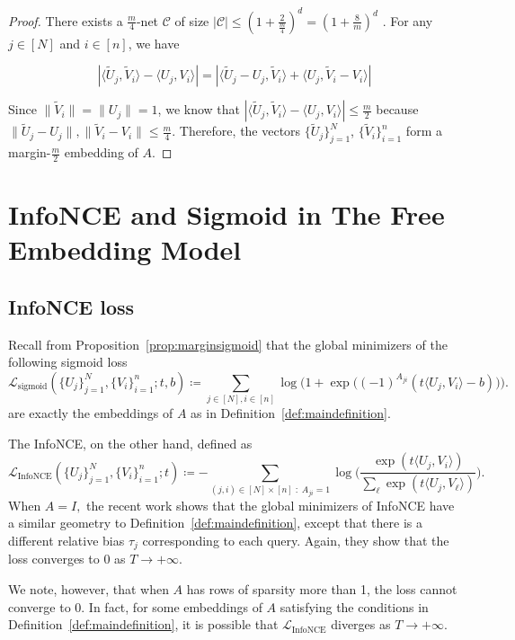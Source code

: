 \documentclass[preprint]{article}
\newcommand{\sigloss}{\mathcal{L}_{\text{sigmoid}}}
\newcommand{\infonceloss}{\mathcal{L}_{\text{InfoNCE}}}
\begin{document}
\begin{proof}
    There exists a $\frac{m}{4}$-net $\mathcal{C}$ of size $|\mathcal{C}| \leq \left(1 + \frac{2}{\frac{m}{4}}\right)^d = \left(1 + \frac{8}{m}\right)^d$ \cite[Corollary 4.2.11] {Vershynin2026}. For any $j \in [N]$ and $i \in [n]$, we have

    $$|\langle \tilde{U}_j, \tilde{V}_i\rangle - \langle U_j, V_i\rangle| =  |\langle \tilde{U}_j - U_j, \tilde{V}_i\rangle + \langle U_j,  \tilde{V}_i - V_i\rangle|$$

    Since $\|\tilde{V}_i\| = \|U_j\| = 1$, we know that $|\langle \tilde{U}_j, \tilde{V}_i\rangle - \langle U_j, V_i\rangle| \leq \frac{m}{2}$ because $\|\tilde{U}_j - U_j\|, \|\tilde{V}_i - V_i\| \leq \frac{m}{4}$. Therefore, the vectors $\{\tilde{U}_j\}_{j = 1}^N$, $\{\tilde{V}_i\}_{i = 1}^n$ form a margin-$\frac{m}{2}$ embedding of $A.$ 
\end{proof}


\section{InfoNCE and Sigmoid in The Free Embedding Model}
\label{sec:freeembedding}
\subsection{InfoNCE loss}
Recall from Proposition~\ref{prop:marginsigmoid} that the global minimizers of the following sigmoid loss
$$
\sigloss(\{U_j\}_{j = 1}^N, \{V_i\}_{i = 1}^n; t, b)\coloneqq \sum_{j\in [N], i \in [n]} \log\Big(1 + \exp\big((-1)^{A_{ji}}(t\langle U_j, V_i\rangle -b)\big)\Big).
$$
are exactly the embeddings of $A$ as in Definition~\ref{def:maindefinition}.

The InfoNCE, on the other hand, defined as
\begin{equation}
\label{eq:definfonce}
\infonceloss(\{U_j\}_{j = 1}^N, \{V_i\}_{i = 1}^n; t)\coloneqq - \sum_{(j,i) \in [N]\times [n]\; : \; A_{ji} = 1}
\log\Big(
\frac{\exp(t\langle U_j, V_i\rangle)}{\sum_\ell \exp(t\langle U_j, V_\ell\rangle)}
\Big).
\end{equation}
When $A = I,$ the recent work \cite{bangachev2025globalminimizerssigmoidcontrastive} shows that the global minimizers of InfoNCE have a similar geometry to Definition~\ref{def:maindefinition}, except that there is a different relative bias $\tau_j$ corresponding to each query. Again, they show that the loss converges to 0 as $T\longrightarrow +\infty.$

We note, however, that when $A$ has rows of sparsity more than 1, the loss cannot converge to 0. In fact, for some embeddings of $A$ satisfying the conditions in Definition~\ref{def:maindefinition}, it is possible that $\infonceloss$ diverges as $T\longrightarrow+\infty.$
\end{document}
